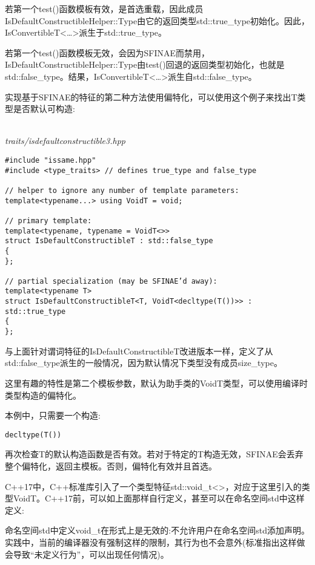 若第一个test()函数模板有效，是首选重载，因此成员IsDefaultConstructibleHelper::Type由它的返回类型std::true\_type初始化。因此，IsConvertibleT<…>派生于std::true\_type。

若第一个test()函数模板无效，会因为SFINAE而禁用，IsDefaultConstructibleHelper::Type由test()回退的返回类型初始化，也就是std::false\_type。结果，IsConvertibleT<…>派生自std::false\_type。


实现基于SFINAE的特征的第二种方法使用偏特化，可以使用这个例子来找出T类型是否默认可构造:

\hspace*{\fill} \\ %
\noindent
\textit{traits/isdefaultconstructible3.hpp}
\begin{lstlisting}[style=styleCXX]
#include "issame.hpp"
#include <type_traits> // defines true_type and false_type

// helper to ignore any number of template parameters:
template<typename...> using VoidT = void;

// primary template:
template<typename, typename = VoidT<>>
struct IsDefaultConstructibleT : std::false_type
{
};

// partial specialization (may be SFINAE’d away):
template<typename T>
struct IsDefaultConstructibleT<T, VoidT<decltype(T())>> : std::true_type
{
};
\end{lstlisting}

与上面针对谓词特征的IsDefaultConstructibleT改进版本一样，定义了从std::false\_type派生的一般情况，因为默认情况下类型没有成员size\_type。

这里有趣的特性是第二个模板参数，默认为助手类的VoidT类型，可以使用编译时类型构造的偏特化。

本例中，只需要一个构造:

\begin{lstlisting}[style=styleCXX]
decltype(T())
\end{lstlisting}

再次检查T的默认构造函数是否有效。若对于特定的T构造无效，SFINAE会丢弃整个偏特化，返回主模板。否则，偏特化有效并且首选。

C++17中，C++标准库引入了一个类型特征std::void\_t<>，对应于这里引入的类型VoidT。C++17前，可以如上面那样自行定义，甚至可以在命名空间std中这样定义:

\begin{tcolorbox}[colback=webgreen!5!white,colframe=webgreen!75!black]
\hspace*{0.75cm}命名空间std中定义void\_t在形式上是无效的:不允许用户在命名空间std添加声明。实践中，当前的编译器没有强制这样的限制，其行为也不会意外(标准指出这样做会导致“未定义行为”，可以出现任何情况)。
\end{tcolorbox}

